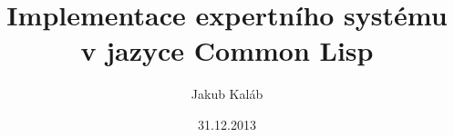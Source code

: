 \documentclass[a4paper,12pt]{article}
\title{Implementace expertního systému v jazyce Common Lisp}
\author{Jakub Kaláb}
\date{31.12.2013}
\begin{document}
\maketitle
\renewcommand\listoflistingscaption{Seznam ukázek kódu}
\renewcommand\listingscaption{Ukázka kódu}
\listoflistings
{}

\newpage
\nocite{introduction}
\nocite{paradigms}
\nocite{doorenbos}
\nocite{practical}
\nocite{clips}
\nocite{clhs}
\nocite{asdf}
\nocite{quicklisp}
\nocite{xlunit}
\nocite{iterate}
\nocite{git}
\nocite{expert-system}
\nocite{rete}

\newpage


% 
% 
% 
% 
% 

\newpage

% 

\end{document}
